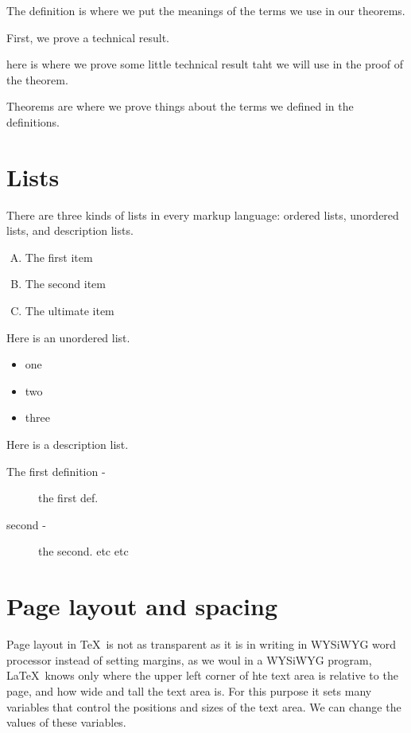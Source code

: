 \documentclass[12pt, leqno]{article}
\numberwithin{equation}{section}
\numberwithin{figure}{section}
\begin{document}
\begin{definition}
The definition is where we put the meanings of the terms we use in our theorems. 
\end{definition}

First, we prove a technical result. 
\begin{lemma}
here is where we prove some little technical result taht we will use in the proof of the theorem.
\end{lemma}

\begin{theorem}
Theorems are where we prove things about the terms we defined in the definitions. 
\end{theorem}

\section*{Lists}
There are three kinds of lists in every markup language: 
ordered lists, unordered lists, and description lists. 

\begin{enumerate}[A)]
\item The first item 
\item The second item 
\item The ultimate item 
\end{enumerate}

Here is an unordered list. 
\begin{itemize}
\item one 
\item two 
\item three
\end{itemize}

Here is a description list. 
\begin{description}
\item[The first definition -] the first def. 
\item[second -] the second. etc etc 
\end{description}


\section*{Page layout and spacing}
Page layout in \TeX\ is not as transparent as it is in writing in WYSiWYG word processor 
instead of setting margins, as we woul in a WYSiWYG program, \LaTeX\ knows only where the 
upper left corner of hte text area is relative to the page, and how wide 
and tall the text area is. 
For this purpose it sets many variables that control the positions and sizes of the text area. 
We can change the values of these variables. 
\end{document}
